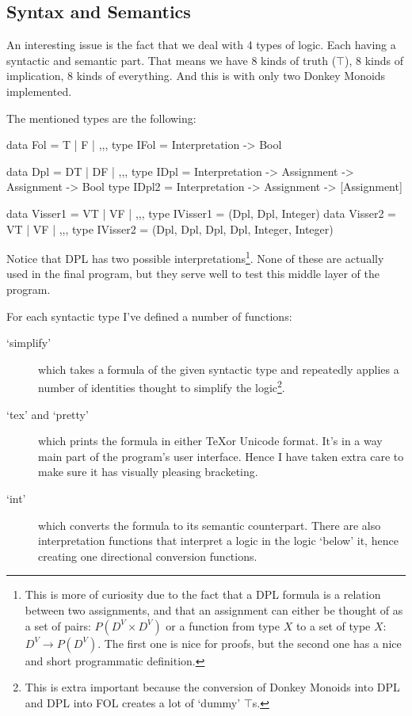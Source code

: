 \documentclass[12pt]{article}
\begin{document}
\subsection{Syntax and Semantics}

An interesting issue is the fact that we deal with 4 types of logic. Each having a syntactic and semantic part. That means we have 8 kinds of truth ($\top$), 8 kinds of implication, 8 kinds of everything. And this is with only two Donkey Monoids implemented.

The mentioned types are the following:

\begin{haskell}
data Fol = T | F | ,,,
type IFol = Interpretation -> Bool

data Dpl = DT | DF | ,,,
type IDpl = Interpretation -> Assignment -> Assignment -> Bool
type IDpl2 = Interpretation -> Assignment -> [Assignment]

data Visser1 = VT | VF | ,,,
type IVisser1 = (Dpl, Dpl, Integer)
data Visser2 = VT | VF | ,,,
type IVisser2 = (Dpl, Dpl, Dpl, Dpl, Integer, Integer)
\end{haskell}

Notice that DPL has two possible interpretations\footnote{This is more of curiosity due to the fact that a DPL formula is a relation between two assignments, and that an assignment can either be thought of as a set of pairs: $P(D^V \times D^V)$ or a function from type $X$ to a set of type $X$: $D^V \rightarrow P(D^V)$. The first one is nice for proofs, but the second one has a nice and short programmatic definition.}. None of these are actually used in the final program, but they serve well to test this middle layer of the program.

For each syntactic type I've defined a number of functions:
\begin{description}
\item[`simplify'] which takes a formula of the given syntactic type and repeatedly applies a number of identities thought to simplify the logic\footnote{This is extra important because the conversion of Donkey Monoids into DPL and DPL into FOL creates a lot of `dummy' $\top$s.}.
\item[`tex' and `pretty'] which prints the formula in either \TeX or Unicode format. It's in a way main part of the program's user interface. Hence I have taken extra care to make sure it has visually pleasing bracketing.
\item[`int'] which converts the formula to its semantic counterpart. There are also interpretation functions that interpret a logic in the logic `below' it, hence creating one directional conversion functions.
\end{description}
\end{document}
